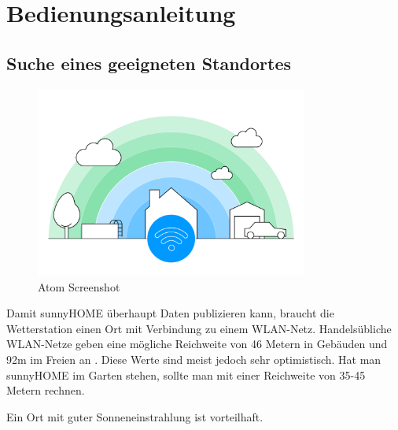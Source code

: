 

\chapter{Bedienungsanleitung}


\section{Suche eines geeigneten Standortes}
    
    \begin{figure}[H]
            \centering
            \includegraphics[width=0.8\textwidth]{./media/images/wifirange.png}
            \caption{Atom Screenshot\cite{bib:WiFiBooster}}
            \label{fig:WiFiRange}
    \end{figure}
    
    Damit sunnyHOME überhaupt Daten publizieren kann, braucht die Wetterstation einen Ort mit Verbindung zu einem WLAN-Netz. Handelsübliche WLAN-Netze geben eine mögliche Reichweite von 46 Metern in Gebäuden und 92m im Freien an \cite{bib:WiFiRange}. Diese Werte sind meist jedoch sehr optimistisch. Hat man sunnyHOME im Garten stehen, sollte man mit einer Reichweite von 35-45 Metern rechnen.
    
    Ein Ort mit guter Sonneneinstrahlung ist vorteilhaft.
    
